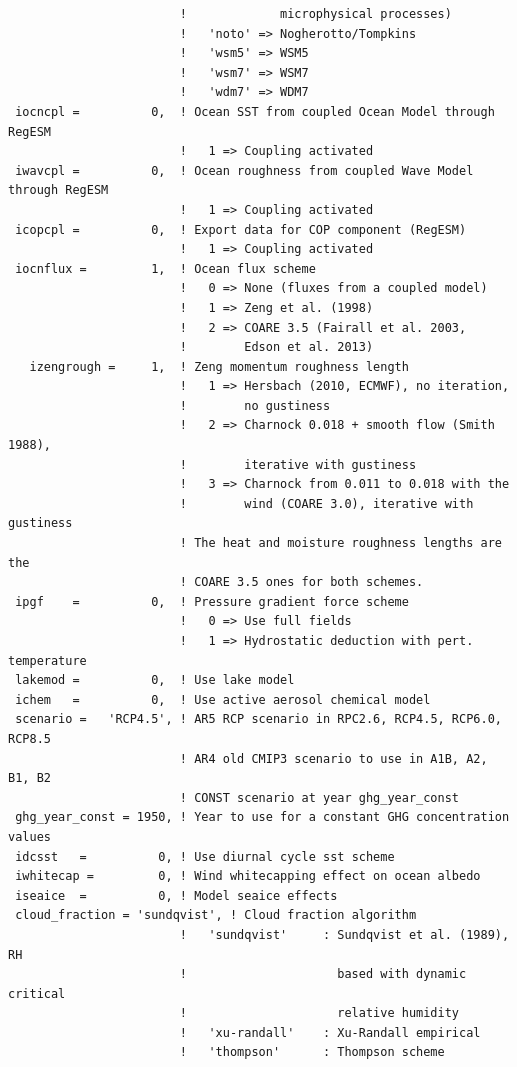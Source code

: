 {\begin{Verbatim}
                        !             microphysical processes)
                        !   'noto' => Nogherotto/Tompkins
                        !   'wsm5' => WSM5
                        !   'wsm7' => WSM7
                        !   'wdm7' => WDM7
 iocncpl =          0,  ! Ocean SST from coupled Ocean Model through RegESM
                        !   1 => Coupling activated
 iwavcpl =          0,  ! Ocean roughness from coupled Wave Model through RegESM
                        !   1 => Coupling activated
 icopcpl =          0,  ! Export data for COP component (RegESM)
                        !   1 => Coupling activated
 iocnflux =         1,  ! Ocean flux scheme
                        !   0 => None (fluxes from a coupled model)
                        !   1 => Zeng et al. (1998)
                        !   2 => COARE 3.5 (Fairall et al. 2003,
                        !        Edson et al. 2013)
   izengrough =     1,  ! Zeng momentum roughness length
                        !   1 => Hersbach (2010, ECMWF), no iteration,
                        !        no gustiness
                        !   2 => Charnock 0.018 + smooth flow (Smith 1988),
                        !        iterative with gustiness
                        !   3 => Charnock from 0.011 to 0.018 with the
                        !        wind (COARE 3.0), iterative with gustiness
                        ! The heat and moisture roughness lengths are the
                        ! COARE 3.5 ones for both schemes.
 ipgf    =          0,  ! Pressure gradient force scheme
                        !   0 => Use full fields
                        !   1 => Hydrostatic deduction with pert. temperature
 lakemod =          0,  ! Use lake model
 ichem   =          0,  ! Use active aerosol chemical model
 scenario =   'RCP4.5', ! AR5 RCP scenario in RPC2.6, RCP4.5, RCP6.0, RCP8.5
                        ! AR4 old CMIP3 scenario to use in A1B, A2, B1, B2
                        ! CONST scenario at year ghg_year_const
 ghg_year_const = 1950, ! Year to use for a constant GHG concentration values
 idcsst   =          0, ! Use diurnal cycle sst scheme
 iwhitecap =         0, ! Wind whitecapping effect on ocean albedo
 iseaice  =          0, ! Model seaice effects
 cloud_fraction = 'sundqvist', ! Cloud fraction algorithm
                        !   'sundqvist'     : Sundqvist et al. (1989), RH
                        !                     based with dynamic critical
                        !                     relative humidity
                        !   'xu-randall'    : Xu-Randall empirical
                        !   'thompson'      : Thompson scheme

\end{Verbatim}}

